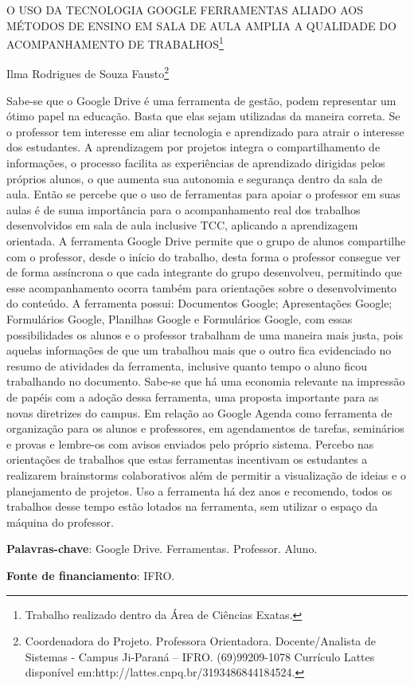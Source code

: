 \documentclass[article,12pt,onesidea,4paper,english,brazil]{abntex2}
\begin{document}
	
	
	\frenchspacing 
	
	\begin{center}
		\LARGE O USO DA TECNOLOGIA GOOGLE FERRAMENTAS ALIADO AOS MÉTODOS DE ENSINO EM SALA DE AULA AMPLIA A QUALIDADE DO ACOMPANHAMENTO DE TRABALHOS\footnote{Trabalho realizado dentro da Área de Ciências Exatas.}
		
		\normalsize
	Ilma Rodrigues de Souza Fausto\footnote{Coordenadora do Projeto. Professora Orientadora. Docente/Analista de Sistemas - Campus Ji-Paraná – IFRO. (69)99209-1078 Currículo Lattes disponível em:http://lattes.cnpq.br/3193486844184524.} 
	\end{center}
	
	\noindent Sabe-se que o Google Drive é uma ferramenta de gestão, podem representar um ótimo papel na
	educação. Basta que elas sejam utilizadas da maneira correta. Se o professor tem interesse em aliar
	tecnologia e aprendizado para atrair o interesse dos estudantes. A aprendizagem por projetos integra o
	compartilhamento de informações, o processo facilita as experiências de aprendizado dirigidas pelos
	próprios alunos, o que aumenta sua autonomia e segurança dentro da sala de aula. Então se percebe
	que o uso de ferramentas para apoiar o professor em suas aulas é de suma importância para o
	acompanhamento real dos trabalhos desenvolvidos em sala de aula inclusive TCC, aplicando a
	aprendizagem orientada. A ferramenta Google Drive permite que o grupo de alunos compartilhe com
	o professor, desde o início do trabalho, desta forma o professor consegue ver de forma assíncrona o
	que cada integrante do grupo desenvolveu, permitindo que esse acompanhamento ocorra também para
	orientações sobre o desenvolvimento do conteúdo. A ferramenta possui: Documentos Google;
	Apresentações Google; Formulários Google, Planilhas Google e Formulários Google, com essas
	possibilidades os alunos e o professor trabalham de uma maneira mais justa, pois aquelas informações
	de que um trabalhou mais que o outro fica evidenciado no resumo de atividades da ferramenta,
	inclusive quanto tempo o aluno ficou trabalhando no documento. Sabe-se que há uma economia
	relevante na impressão de papéis com a adoção dessa ferramenta, uma proposta importante para as
	novas diretrizes do campus. Em relação ao Google Agenda como ferramenta de organização para os
	alunos e professores, em agendamentos de tarefas, seminários e provas e lembre-os com avisos
	enviados pelo próprio sistema. Percebo nas orientações de trabalhos que estas ferramentas incentivam
	os estudantes a realizarem brainstorms colaborativos além de permitir a visualização de ideias e o
	planejamento de projetos. Uso a ferramenta há dez anos e recomendo, todos os trabalhos desse tempo
	estão lotados na ferramenta, sem utilizar o espaço da máquina do professor.
	
	\vspace{\onelineskip}
	
	\noindent
	\textbf{Palavras-chave}: Google Drive. Ferramentas. Professor. Aluno.
	
		\vspace{\onelineskip}
	
	\noindent
	\textbf{Fonte de financiamento}: IFRO.
\end{document}
